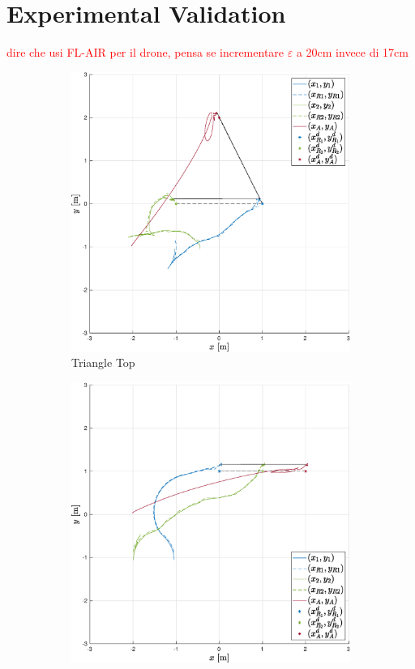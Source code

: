 \documentclass{ifacconf}
\begin{document}
\section{Experimental Validation}
\label{sec:experimental_validation}
\textcolor{red}{dire che usi FL-AIR per il drone, pensa se incrementare $\varepsilon$ a 20cm invece di 17cm}
\begin{figure}
    \centering
    \begin{subfigure}[b]{0.31\columnwidth}
        \centering
        \includegraphics[width=\linewidth]{images/experiment/nominal/1st_scenario_exp.eps}
        \caption{Triangle Top}
    \end{subfigure}
    \begin{subfigure}[b]{0.31\columnwidth}
        \centering
        \includegraphics[width=\linewidth]{images/experiment/nominal/2nd_scenario_exp.eps}

\end{subfigure}
\end{figure}
\end{document}
